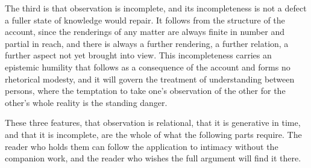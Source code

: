 The third is that observation is incomplete, and its incompleteness is not a defect a fuller state of knowledge would repair. It follows from the structure of the account, since the renderings of any matter are always finite in number and partial in reach, and there is always a further rendering, a further relation, a further aspect not yet brought into view. This incompleteness carries an epistemic humility that follows as a consequence of the account and forms no rhetorical modesty, and it will govern the treatment of understanding between persons, where the temptation to take one's observation of the other for the other's whole reality is the standing danger.

These three features, that observation is relational, that it is generative in time, and that it is incomplete, are the whole of what the following parts require. The reader who holds them can follow the application to intimacy without the companion work, and the reader who wishes the full argument will find it there.
